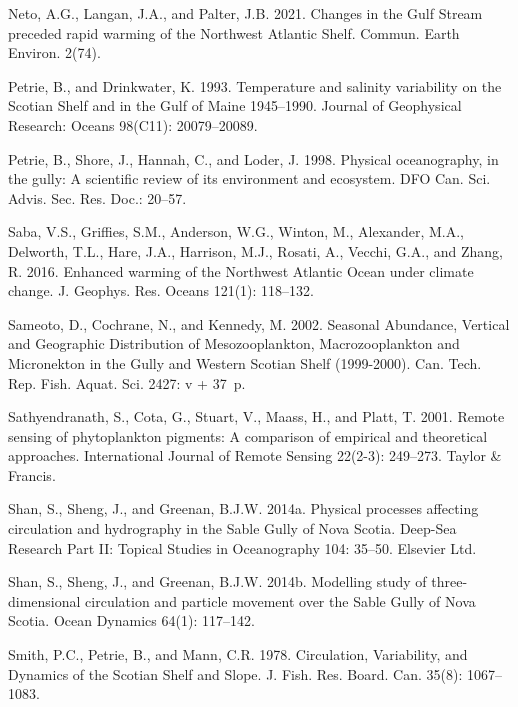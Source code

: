 \documentclass[12pt]{article}\usepackage[]{graphicx}\usepackage[]{color}
\begin{document}
\begin{CSLReferences}{1}{0}
%
Neto, A.G., Langan, J.A., and Palter, J.B. 2021. Changes in the {Gulf} {Stream} preceded rapid warming of the {Northwest} {Atlantic} {Shelf}. Commun. Earth Environ. 2(74).

%
Petrie, B., and Drinkwater, K. 1993. {Temperature and salinity variability on the Scotian Shelf and in the Gulf of Maine 1945--1990}. Journal of Geophysical Research: Oceans 98(C11): 20079--20089.

%
Petrie, B., Shore, J., Hannah, C., and Loder, J. 1998. {Physical oceanography, in the gully: A scientific review of its environment and ecosystem}. DFO Can. Sci. Advis. Sec. Res. Doc.: 20--57.

%
Saba, V.S., Griffies, S.M., Anderson, W.G., Winton, M., Alexander, M.A., Delworth, T.L., Hare, J.A., Harrison, M.J., Rosati, A., Vecchi, G.A., and Zhang, R. 2016. {Enhanced warming of the Northwest Atlantic Ocean under climate change}. J. Geophys. Res. Oceans 121(1): 118--132.

%
Sameoto, D., Cochrane, N., and Kennedy, M. 2002. {Seasonal Abundance, Vertical and Geographic Distribution of Mesozooplankton, Macrozooplankton and Micronekton in the Gully and Western Scotian Shelf (1999-2000)}. Can. Tech. Rep. Fish. Aquat. Sci. 2427: v + 37~p.

%
Sathyendranath, S., Cota, G., Stuart, V., Maass, H., and Platt, T. 2001. {Remote sensing of phytoplankton pigments: A comparison of empirical and theoretical approaches}. International Journal of Remote Sensing 22(2-3): 249--273. Taylor \& Francis.

%
Shan, S., Sheng, J., and Greenan, B.J.W. 2014a. {Physical processes affecting circulation and hydrography in the Sable Gully of Nova Scotia}. Deep-Sea Research Part II: Topical Studies in Oceanography 104: 35--50. Elsevier Ltd.

%
Shan, S., Sheng, J., and Greenan, B.J.W. 2014b. {Modelling study of three-dimensional circulation and particle movement over the Sable Gully of Nova Scotia}. Ocean Dynamics 64(1): 117--142.

%
Smith, P.C., Petrie, B., and Mann, C.R. 1978. {Circulation, Variability, and Dynamics of the Scotian Shelf and Slope}. J. Fish. Res. Board. Can. 35(8): 1067--1083.


\end{CSLReferences}
\end{document}
